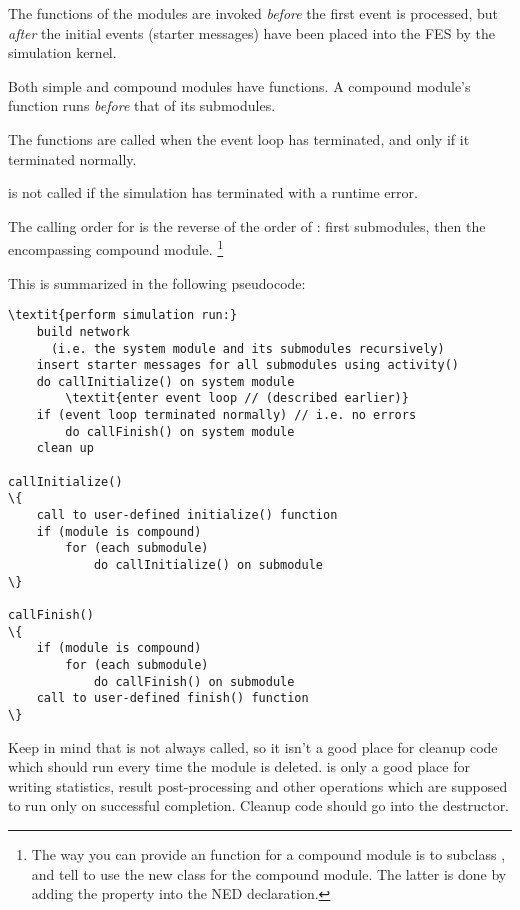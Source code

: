 The  functions of the modules are invoked \textit{before}
the first event is processed, but \textit{after} the initial events (starter
messages) have been placed into the FES by
the simulation kernel.

Both simple and compound modules have  functions. A
compound module's  function runs \textit{before} that of
its submodules.

The  functions are called when the event loop
has terminated, and only if it terminated normally.

\begin{note}
 is not called if the simulation has terminated
with a runtime error.
\end{note}

The calling order for  is the reverse of the order of
: first submodules, then the encompassing compound module.
  \footnote{The way you can provide an  function
  for a compound module is to subclass , and tell
  {\opp} to use the new class for the compound module. The latter is done
  by adding the  property into the NED declaration.}

This is summarized in the following pseudocode:


\begin{Verbatim}[commandchars=\\\{\}]
\textit{perform simulation run:}
    build network
      (i.e. the system module and its submodules recursively)
    insert starter messages for all submodules using activity()
    do callInitialize() on system module
        \textit{enter event loop // (described earlier)}
    if (event loop terminated normally) // i.e. no errors
        do callFinish() on system module
    clean up

callInitialize()
\{
    call to user-defined initialize() function
    if (module is compound)
        for (each submodule)
            do callInitialize() on submodule
\}

callFinish()
\{
    if (module is compound)
        for (each submodule)
            do callFinish() on submodule
    call to user-defined finish() function
\}
\end{Verbatim}

Keep in mind that  is not always called, so it isn't a
good place for cleanup code which should run every time the module is
deleted.  is only a good place for writing statistics,
result post-processing and other operations  which are supposed to run only on
successful completion. Cleanup code should go into the
destructor.


